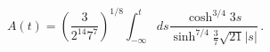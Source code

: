 \begin{equation}
\label{eq. int}
A(t)=\left( \frac{3}{2^{14}7^{7}}\right) ^{1/8}\int _{-\infty }^{t}ds\frac{\cosh ^{3/4}3s}{\sinh ^{7/4}\frac{3}{7}\sqrt{21}|s|}\, .
\end{equation}


